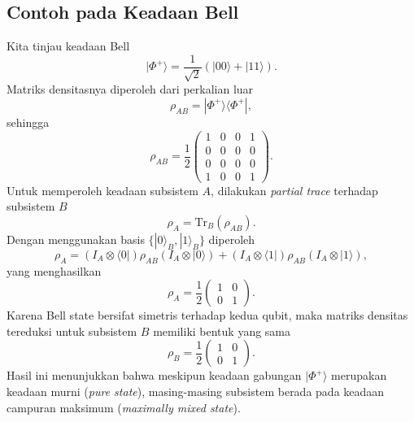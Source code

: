 \subsection{Contoh pada Keadaan Bell}
Kita tinjau keadaan Bell
\begin{equation}
\label{eq:bell_state_phi_plus}
    |\Phi^+\rangle
    =
    \frac{1}{\sqrt{2}}
    \left(
    |00\rangle + |11\rangle
    \right).
\end{equation}
Matriks densitasnya diperoleh dari perkalian luar
\begin{equation}
    \rho_{AB}
    =
    |\Phi^+\rangle
    \langle\Phi^+|,
\end{equation}
sehingga
\begin{equation}
    \rho_{AB}
    =
    \frac{1}{2}
    \begin{pmatrix}
        1 & 0 & 0 & 1 \\
        0 & 0 & 0 & 0 \\
        0 & 0 & 0 & 0 \\
        1 & 0 & 0 & 1
    \end{pmatrix}.
\end{equation}
Untuk memperoleh keadaan subsistem $A$, dilakukan \textit{partial trace} terhadap subsistem $B$
\begin{equation}
    \rho_A
    =
    \mathrm{Tr}_B(\rho_{AB}).
\end{equation}
Dengan menggunakan basis $\{|0\rangle_B,|1\rangle_B\}$ diperoleh
\begin{equation}
    \rho_A
    =
    (I_A\otimes\langle0|)
    \rho_{AB}
    (I_A\otimes|0\rangle)
    +
    (I_A\otimes\langle1|)
    \rho_{AB}
    (I_A\otimes|1\rangle),
\end{equation}
yang menghasilkan
\begin{equation}
\label{eq:rho_A_bell}
    \rho_A
    =
    \frac{1}{2}
    \begin{pmatrix}
        1 & 0 \\
        0 & 1
    \end{pmatrix}.
\end{equation}
Karena Bell state bersifat simetris terhadap kedua qubit, maka matriks densitas tereduksi untuk subsistem $B$ memiliki bentuk yang sama
\begin{equation}
\label{eq:rho_B_bell}
    \rho_B
    =
    \frac{1}{2}
    \begin{pmatrix}
        1 & 0 \\
        0 & 1
    \end{pmatrix}.
\end{equation}
Hasil ini menunjukkan bahwa meskipun keadaan gabungan $|\Phi^+\rangle$ merupakan keadaan murni (\textit{pure state}), masing-masing subsistem berada pada keadaan campuran maksimum (\textit{maximally mixed state}).

